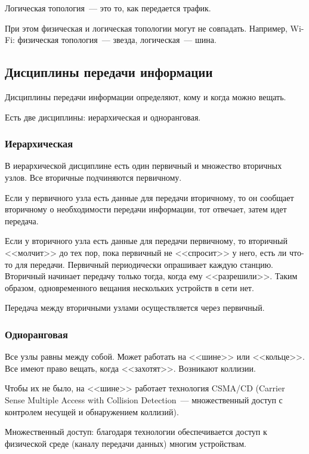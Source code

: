 Логическая топология~--- это то, как передается трафик.

При этом физическая и логическая топологии могут не совпадать. Например, Wi-Fi: физическая топология~--- звезда, логическая~--- шина.

\subsection{Дисциплины передачи информации}

Дисциплины передачи информации определяют, кому и когда можно вещать.

Есть две дисциплины: иерархическая и одноранговая.

\subsubsection{Иерархическая}

В иерархической дисциплине есть один первичный и множество вторичных узлов. Все вторичные подчиняются первичному.

Если у первичного узла есть данные для передачи вторичному, то он сообщает вторичному о необходимости передачи информации, тот отвечает, затем идет передача.

Если у вторичного узла есть данные для передачи первичному, то вторичный <<молчит>> до тех пор, пока первичный не <<спросит>> у него, есть ли что-то для передачи. Первичный периодически опрашивает каждую станцию. Вторичный начинает передачу только тогда, когда ему <<разрешили>>. Таким образом, одновременного вещания нескольких устройств в сети нет.

Передача между вторичными узлами осуществляется через первичный.

\subsubsection{Одноранговая}

Все узлы равны между собой. Может работать на <<шине>> или <<кольце>>. Все имеют право вещать, когда <<захотят>>. Возникают коллизии.

Чтобы их не было, на <<шине>> работает технология CSMA/CD (Carrier Sense Multiple Access with Collision Detection~--- множественный доступ с контролем несущей и обнаружением коллизий).

Множественный доступ: благодаря технологии обеспечивается доступ к физической среде (каналу передачи данных) многим устройствам.

